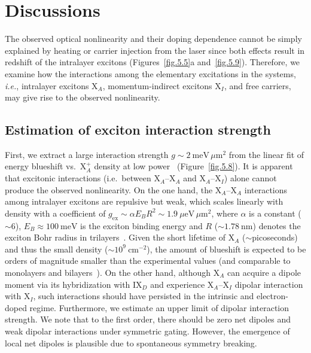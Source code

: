 \renewcommand{\baselinestretch}{2}
\small\normalsize

\section{Discussions}
The observed optical nonlinearity and their doping dependence cannot be simply explained by heating or carrier injection from the laser since both effects result in redshift of the intralayer excitons (Figures~\ref{fig.5.5}a and~\ref{fig.5.9}). 
Therefore, we examine how the interactions among the elementary excitations in the systems, \textit{i.e.}, intralayer excitons X$_A$, momentum-indirect excitons X$_I$, and free carriers, may give rise to the observed nonlinearity.

\subsection{Estimation of exciton interaction strength}
First, we extract a large interaction strength $g \sim 2~\mathrm{meV}\,\mu\mathrm{m}^{2}$ from the linear fit of energy blueshift vs.\ X$_A^+$ density at low power~\cite{Stepanov2021-ez} (Figure~\ref{fig.5.8}). 
It is apparent that excitonic interactions (i.e.\ between X$_A$--X$_A$ and X$_A$--X$_I$) alone cannot produce the observed nonlinearity. 
On the one hand, the X$_A$--X$_A$ interactions among intralayer excitons are repulsive but weak, which scales linearly with density with a coefficient of $g_{\mathrm{ex}}\sim \alpha E_B R^{2}\sim 1.9~\mu\mathrm{eV}\,\mu\mathrm{m}^{2}$, where $\alpha$ is a constant ($\sim 6$), $E_B \approx 100~\mathrm{meV}$ is the exciton binding energy and $R$ ($\sim 1.78~\mathrm{nm}$) denotes the exciton Bohr radius in trilayers~\cite{Scuri2018-bn}. 
Given the short lifetime of X$_A$ ($\sim$picoseconds)~\cite{Wang2014-gz,Hsu2015-zo} and thus the small density ($\sim 10^{9}~\mathrm{cm}^{-2}$), the amount of blueshift is expected to be orders of magnitude smaller than the experimental values (and comparable to monolayers and bilayers~\cite{Wang2018-pz,Scuri2018-bn}). 
On the other hand, although X$_A$ can acquire a dipole moment via its hybridization with IX$_D$ and experience X$_A$--X$_I$ dipolar interaction with X$_I$, such interactions should have persisted in the intrinsic and electron-doped regime. 
Furthermore, we estimate an upper limit of dipolar interaction strength. 
We note that to the first order, there should be zero net dipoles and weak dipolar interactions under symmetric gating. 
However, the emergence of local net dipoles is plausible due to spontaneous symmetry breaking. 
